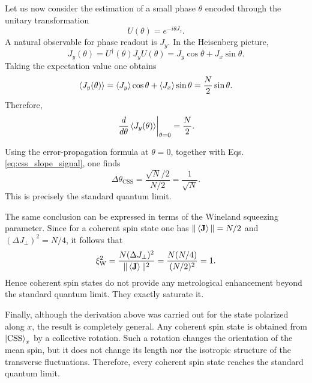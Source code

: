 Let us now consider the estimation of a small phase \(\theta\) encoded through the unitary transformation
\begin{equation}
	U(\theta)=e^{-i\theta J_z}.
	\label{eq:css_phase_encoding}
\end{equation}
A natural observable for phase readout is \(J_y\). In the Heisenberg picture,
\begin{equation}
	J_y(\theta)
	=
	U^\dagger(\theta) J_y U(\theta)
	=
	J_y\cos\theta+J_x\sin\theta.
	\label{eq:Jy_theta_rotation}
\end{equation}
Taking the expectation value one obtains
\begin{equation}
	\expval{J_y(\theta)}
	=
	\expval{J_y}\cos\theta+\expval{J_x}\sin\theta
	=
	\frac{N}{2}\sin\theta.
	\label{eq:css_Jy_theta_mean}
\end{equation}
Therefore,
\begin{equation}
	\left.
	\frac{d}{d\theta}\expval{J_y(\theta)}
	\right|_{\theta=0}
	=
	\frac{N}{2}.
	\label{eq:css_slope_signal}
\end{equation}

Using the error-propagation formula at \(\theta=0\), together with Eqs. \eqref{eq:css_slope_signal}, one finds
\begin{equation}
	\Delta\theta_{\mathrm{CSS}}
	=
	\frac{\sqrt{N}/2}{N/2}
	=
	\frac{1}{\sqrt{N}}.
	\label{eq:css_sql_result}
\end{equation}
This is precisely the standard quantum limit.

The same conclusion can be expressed in terms of the Wineland squeezing parameter. Since for a coherent spin state one has \(\|\expval{\mathbf{J}}\|=N/2\) and \((\Delta J_\perp)^2=N/4\), it follows that
\begin{equation}
	\xi_{\mathrm{W}}^2
	=
	\frac{N(\Delta J_\perp)^2}{\|\expval{\mathbf{J}}\|^2}
	=
	\frac{N(N/4)}{(N/2)^2}
	=
	1.
	\label{eq:css_wineland_equals_one}
\end{equation}
Hence coherent spin states do not provide any metrological enhancement beyond the standard quantum limit. They exactly saturate it.

Finally, although the derivation above was carried out for the state polarized along \(x\), the result is completely general. Any coherent spin state is obtained from \(\ket{\mathrm{CSS}}_x\) by a collective rotation. Such a rotation changes the orientation of the mean spin, but it does not change its length nor the isotropic structure of the transverse fluctuations. Therefore, every coherent spin state reaches the standard quantum limit.


